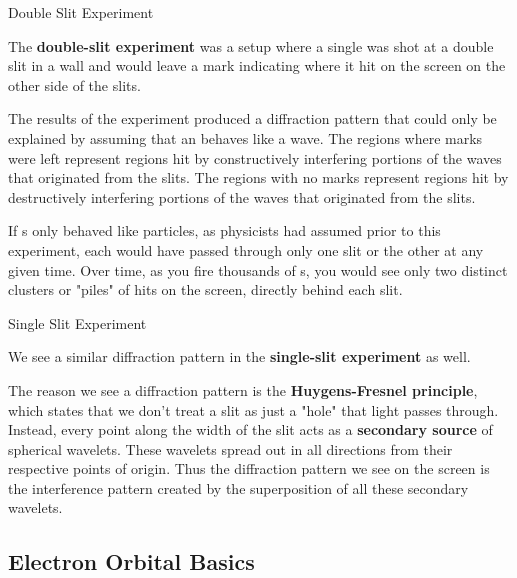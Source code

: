 \documentclass[10pt]{article}
\begin{document}
    \begin{core}{Double Slit Experiment}

      The \textbf{double-slit experiment} was a setup where a single  was shot at a double slit in a wall and would leave a mark indicating where it hit on the screen on the other side of the slits.


      The results of the experiment produced a diffraction pattern that could only be explained by assuming that an  behaves like a wave. The regions where marks were left represent regions hit by constructively interfering portions of the waves that originated from the slits. The regions with no marks represent regions hit by destructively interfering portions of the waves that originated from the slits.

      If s only behaved like particles, as physicists had assumed prior to this experiment, each would have passed through only one slit or the other at any given time. Over time, as you fire thousands of s, you would see only two distinct clusters or "piles" of hits on the screen, directly behind each slit.

    \end{core}

    \begin{core}{Single Slit Experiment}

      We see a similar diffraction pattern in the \textbf{single-slit experiment} as well.


      The reason we see a diffraction pattern is the \textbf{Huygens-Fresnel principle}, which states that we don't treat a slit as just a "hole" that light passes through. Instead, every point along the width of the slit acts as a \textbf{secondary source} of spherical wavelets. These wavelets spread out in all directions from their respective points of origin. Thus the diffraction pattern we see on the screen is the interference pattern created by the superposition of all these secondary wavelets.

    \end{core}

  \subsection{Electron Orbital Basics}
\end{document}
